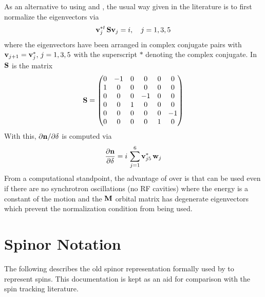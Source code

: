{As an alternative to using  and , the usual way given in the literature is to first
normalize the eigenvectors via \cite{b:chao79}
\begin{equation}
  {\bf v}_j^{*t} \, {\bf S} {\bf v}_j = i, \quad j = 1, 3, 5
  \label{vsvi}
\end{equation}
where the eigenvectors have been arranged in complex conjugate pairs with ${\bf v}_{j+1} = {\bf v}_j^*, \,
j = 1, 3, 5$ with the superscript $*$ denoting the complex conjugate. In  ${\bf S}$ is the matrix
\begin{equation}
  {\bf S} = \begin{pmatrix}
      0 & -1 &  0 &  0 &  0 &  0 \\
      1 &  0 &  0 &  0 &  0 &  0 \\
      0 &  0 &  0 & -1 &  0 &  0 \\
      0 &  0 &  1 &  0 &  0 &  0 \\
      0 &  0 &  0 &  0 &  0 & -1 \\
      0 &  0 &  0 &  0 &  1 &  0 \\
  \end{pmatrix}
\end{equation}
With this, ${\partial {\bf n}}/{\partial \delta}$ is computed via
\begin{equation}
  \frac{\partial {\bf n}}{\partial \delta} = i \, \sum_{j = 1}^6 {\bf v}_{j5}^* \, {\bf w}_j
  \label{ndivw}
\end{equation}
From a computational standpoint, the advantage of  over  is that 
can be used even if there are no synchrotron oscillations (no RF cavities) where the energy is a
constant of the motion and the ${\bf M}$ orbital matrix has degenerate eigenvectors which prevent the
normalization condition  from being used.

\section{Spinor Notation}

The following describes the old spinor representation formally used by \bmad to represent
spins. This documentation is kept as an aid for comparison with the spin tracking literature.

}
